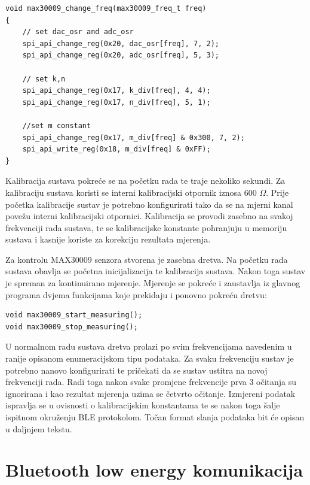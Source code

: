 \documentclass[../diplomski_rad.tex]{subfiles}
\begin{document}
\begin{lstlisting}[label={lst:promjena_frekvencije},style=CStyle,caption={Funkcija za promjenu frekvenciju sustava},captionpos=b]
void max30009_change_freq(max30009_freq_t freq)
{
    // set dac_osr and adc_osr
    spi_api_change_reg(0x20, dac_osr[freq], 7, 2);
    spi_api_change_reg(0x20, adc_osr[freq], 5, 3);

    // set k,n
    spi_api_change_reg(0x17, k_div[freq], 4, 4);
    spi_api_change_reg(0x17, n_div[freq], 5, 1);

    //set m constant
    spi_api_change_reg(0x17, m_div[freq] & 0x300, 7, 2);         
    spi_api_write_reg(0x18, m_div[freq] & 0xFF);
}
\end{lstlisting}

Kalibracija sustava pokreće se na početku rada te traje nekoliko sekundi.
Za kalibraciju sustava koristi se interni kalibracijski otpornik iznosa 600 $\Omega$. 
Prije početka kalibracije sustav je potrebno konfigurirati tako da se na mjerni kanal povežu 
interni kalibracijski otpornici. 
Kalibracija se provodi zasebno na svakoj frekvenciji rada sustava, te se kalibracijske konstante pohranjuju 
u memoriju sustava i kasnije koriste za korekciju rezultata mjerenja. 

Za kontrolu MAX30009 senzora stvorena je zasebna dretva. Na početku rada sustava obavlja se početna inicijalizacija te 
kalibracija sustava. Nakon toga sustav je spreman za kontinuirano mjerenje. Mjerenje se pokreće i zaustavlja iz 
glavnog programa dvjema funkcijama koje prekidaju i ponovno pokreću dretvu:
\begin{lstlisting}[label={lst:max30009_kontrola},style=CStyle,caption={Funkcije za početak i prekid mjerenja},captionpos=b]
void max30009_start_measuring();
void max30009_stop_measuring();
\end{lstlisting}
U normalnom radu sustava dretva prolazi po svim frekvencijama navedenim u ranije opisanom enumeracijskom tipu podataka. 
Za svaku frekvenciju sustav je potrebno nanovo konfigurirati te pričekati da se sustav ustitra na novoj frekvenciji rada. 
Radi toga nakon svake promjene frekvencije prva 3 očitanja su ignorirana i kao rezultat mjerenja uzima se četvrto očitanje. 
Izmjereni podatak ispravlja se u ovisnosti o kalibracijskim konstantama te se nakon toga šalje ispitnom okruženju BLE protokolom. 
Točan format slanja podataka bit će opisan u daljnjem tekstu.

\section{Bluetooth low energy komunikacija}
\end{document}

